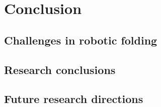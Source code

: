 \documentclass[\home/main.tex]{subfiles}
\begin{document}
\chapter{Conclusion}\label{ch:conclusion}

\section{Challenges in robotic folding}
\section{Research conclusions}
\section{Future research directions}
\end{document}
